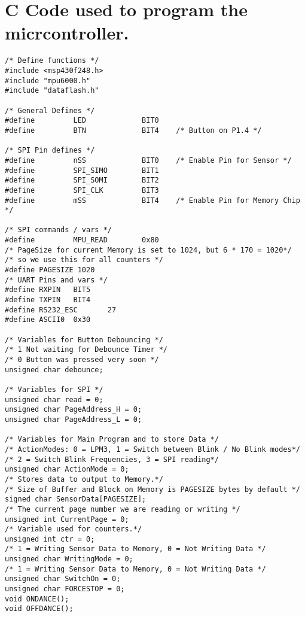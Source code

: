 \chapter{C Code used to program the micrcontroller.}
\label{Chap:CCODE}
\begin{lstlisting}[caption=main.h,label=Code1]
/* Define functions */
#include <msp430f248.h>
#include "mpu6000.h"
#include "dataflash.h"

/* General Defines */
#define         LED             BIT0
#define         BTN             BIT4    /* Button on P1.4 */

/* SPI Pin defines */
#define         nSS             BIT0    /* Enable Pin for Sensor */
#define         SPI_SIMO        BIT1
#define         SPI_SOMI        BIT2
#define         SPI_CLK         BIT3
#define         mSS             BIT4    /* Enable Pin for Memory Chip */

/* SPI commands / vars */
#define         MPU_READ        0x80
/* PageSize for current Memory is set to 1024, but 6 * 170 = 1020*/
/* so we use this for all counters */
#define PAGESIZE 1020 				
/* UART Pins and vars */
#define RXPIN   BIT5
#define TXPIN   BIT4
#define RS232_ESC       27
#define ASCII0  0x30

/* Variables for Button Debouncing */
/* 1 Not waiting for Debounce Timer */
/* 0 Button was pressed very soon */
unsigned char debounce;               

/* Variables for SPI */
unsigned char read = 0;
unsigned char PageAddress_H = 0;
unsigned char PageAddress_L = 0;

/* Variables for Main Program and to store Data */
/* ActionModes: 0 = LPM3, 1 = Switch between Blink / No Blink modes*/
/* 2 = Switch Blink Frequencies, 3 = SPI reading*/
unsigned char ActionMode = 0;
/* Stores data to output to Memory.*/
/* Size of Buffer and Block on Memory is PAGESIZE bytes by default */
signed char SensorData[PAGESIZE];
/* The current page number we are reading or writing */
unsigned int CurrentPage = 0;
/* Variable used for counters.*/	
unsigned int ctr = 0;		
/* 1 = Writing Sensor Data to Memory, 0 = Not Writing Data */
unsigned char WritingMode = 0;
/* 1 = Writing Sensor Data to Memory, 0 = Not Writing Data */
unsigned char SwitchOn = 0; 
unsigned char FORCESTOP = 0; 
void ONDANCE();
void OFFDANCE();


\end{lstlisting}
